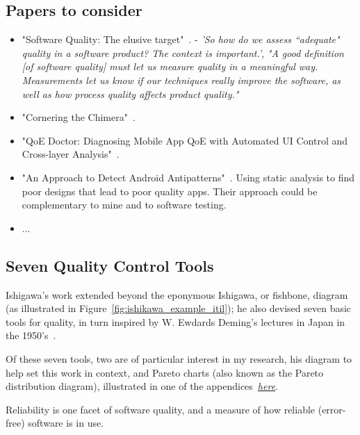 \subsection{Papers to consider}

\begin{itemize}
    \item "Software Quality: The elusive target"~\cite{kitchenham1996_software_quality_elusive_target}. - \emph{'So how do we assess ``adequate" quality in a software product? The context is important.'}, \emph{"A good definition [of software quality] must let us measure quality in a meaningful way. Measurements let us know if our techniques really improve the software, as well as how process quality affects product quality."}
    \item "Cornering the Chimera"~\cite{dromey1996_cornering_the_chimera}.
    \item "QoE Doctor: Diagnosing Mobile App QoE with Automated UI Control and Cross-layer Analysis"~\cite{chen2014qoe}.
    \item "An Approach to Detect Android Antipatterns"~\cite{hecht2015approach}. Using static analysis to find poor designs that lead to poor quality apps. Their approach could be complementary to mine and to software testing.
    \item ...
\end{itemize}

\subsection{Seven Quality Control Tools}
Ishigawa's work extended beyond the eponymous Ishigawa, or fishbone, diagram (as illustrated in Figure~\ref{fig:ishikawa_example_itil}); he also devised seven basic tools for quality, in turn inspired by W. Ewdards Deming's lectures in Japan in the 1950's~\cite{7_basic_quality_tools_with_R}.

Of these seven tools, two are of particular interest in my research, his diagram to help set this work in context, and Pareto charts (also known as the Pareto distribution diagram), illustrated in one of the appendices~\hyperlink{pareto.diagrams.in.r}{\emph{here}}.

Reliability is one facet of software quality, and a measure of how reliable (error-free) software is in use.  


